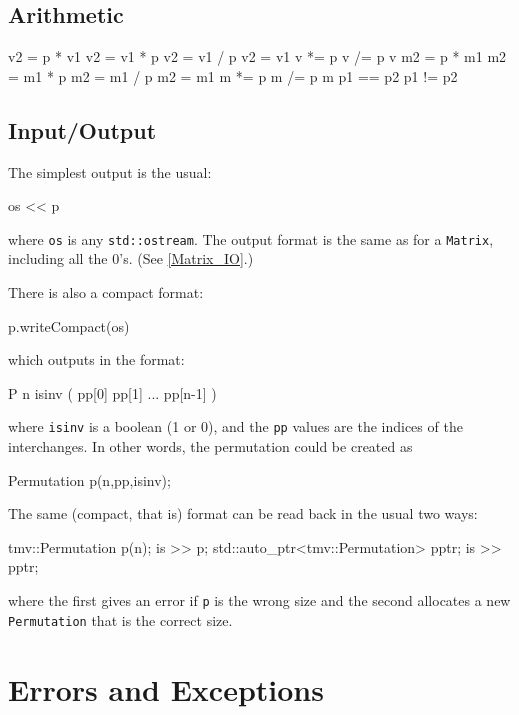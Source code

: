 \documentclass[twoside,letterpaper,11pt]{article}
\renewcommand{\tt}[1]{{\lstinline {#1}}}
\begin{document}
\subsection{Arithmetic}
\label{Permutation_Arithmetic}

\begin{tmvcode}
v2 = p * v1
v2 = v1 * p
v2 = v1 / p
v2 = v1 %
v *= p
v /= p
v %
m2 = p * m1
m2 = m1 * p
m2 = m1 / p
m2 = m1 %
m *= p
m /= p
m %
p1 == p2
p1 != p2
\end{tmvcode}

\subsection{Input/Output}
\label{Permutation_IO}

The simplest output is the usual:
\begin{tmvcode}
os << p
\end{tmvcode}
where \tt{os} is any \tt{std::ostream}.
The output format is the same as for a \tt{Matrix}, including all the 0's.
(See \ref{Matrix_IO}.)

There is also a compact format:
\begin{tmvcode}
p.writeCompact(os)
\end{tmvcode}
which outputs in the format:
\begin{tmvcode}
P n isinv ( pp[0]  pp[1]  ...  pp[n-1] )
\end{tmvcode}
where \tt{isinv} is a boolean (1 or 0), and the \tt{pp} values are the 
indices of the interchanges.
In other words, the permutation could be created as
\begin{tmvcode}
Permutation p(n,pp,isinv);
\end{tmvcode}

The same (compact, that is) format can be read back in the usual two ways:
\begin{tmvcode}
tmv::Permutation p(n);
is >> p;
std::auto_ptr<tmv::Permutation> pptr;
is >> pptr;
\end{tmvcode}
where the first gives an error if \tt{p} is the wrong size and the second allocates
a new \tt{Permutation} that is the correct size.


\newpage
\section{Errors and Exceptions}
\label{Exceptions}
\end{document}
